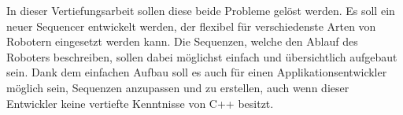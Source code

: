 In dieser Vertiefungsarbeit sollen diese beide Probleme gelöst werden.
Es soll ein neuer Sequencer entwickelt werden, der flexibel für verschiedenste Arten von Robotern eingesetzt werden kann.
Die Sequenzen, welche den Ablauf des Roboters beschreiben, sollen dabei möglichst einfach und übersichtlich aufgebaut sein.
Dank dem einfachen Aufbau soll es auch für einen Applikationsentwickler möglich sein, Sequenzen anzupassen und zu erstellen, auch wenn dieser Entwickler keine vertiefte Kenntnisse von C++ besitzt.

